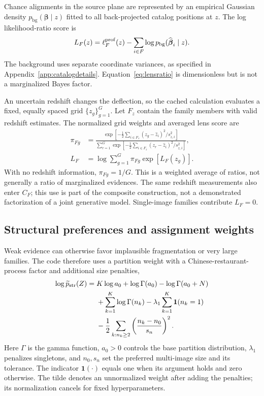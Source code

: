 \documentclass[twocolumn,twocolappendix,linenumbers]{aastex701}
\newcommand{\ind}{\mathbf{1}}
\newcommand{\bg}{\mathrm{bg}}
\begin{document}
Chance alignments in the source plane are represented by an empirical Gaussian density $p_{\bg}(\boldsymbol{\beta}\mid z)$ fitted to all back-projected catalog positions at $z$.
The log likelihood-ratio score is
\begin{equation}
 L_F(z)=\ell_F^{\rm prof}(z)
       -\sum_{i\in F}\log p_{\bg}(\widehat{\boldsymbol{\beta}}_i\mid z).
 \label{eq:lensratio}
\end{equation}
The background uses separate coordinate variances, as specified in Appendix~\ref{app:catalogdetails}.
Equation~\ref{eq:lensratio} is dimensionless but is not a marginalized Bayes factor.

An uncertain redshift changes the deflection, so the cached calculation evaluates a fixed, equally spaced grid $\{z_g\}_{g=1}^{G}$.
Let $F_z$ contain the family members with valid redshift estimates.
The normalized grid weights and averaged lens score are
\begin{equation}
 \begin{aligned}
 \pi_{Fg}&=
 \frac{\exp[-\tfrac12\sum_{i\in F_z}
           (z_g-\hat z_i)^2/s_{z,i}^2]}
      {\sum_{r=1}^{G}\exp[-\tfrac12\sum_{i\in F_z}
           (z_r-\hat z_i)^2/s_{z,i}^2]},\\
 L_F&=\log\sum_{g=1}^{G}\pi_{Fg}\exp[L_F(z_g)].
 \end{aligned}
 \label{eq:redshift}
\end{equation}
With no redshift information, $\pi_{Fg}=1/G$.
This is a weighted average of ratios, not generally a ratio of marginalized evidences.
The same redshift measurements also enter $C_F$; this use is part of the composite construction, not a demonstrated factorization of a joint generative model.
Single-image families contribute $L_F=0$.

\subsection{Structural preferences and assignment weights}
\label{sec:weights}
Weak evidence can otherwise favor implausible fragmentation or very large families.
The code therefore uses a partition weight with a Chinese-restaurant-process factor \citep{Pitman1995} and additional size penalties,
\begin{equation}
 \begin{aligned}
 \log\widetilde p_{\rm str}(Z)
 ={}&K\log a_0+\log\Gamma(a_0)-\log\Gamma(a_0+N)\\
 &+\sum_{k=1}^{K}\log\Gamma(n_k)
 -\lambda_1\sum_{k=1}^{K}\ind(n_k=1)\\
 &-\frac12\sum_{k:n_k\geq2}
       \left(\frac{n_k-n_0}{s_n}\right)^2.
 \end{aligned}
 \label{eq:prior}
\end{equation}
Here $\Gamma$ is the gamma function, $a_0>0$ controls the base partition distribution, $\lambda_1$ penalizes singletons, and $n_0,s_n$ set the preferred multi-image size and its tolerance.
The indicator $\ind(\cdot)$ equals one when its argument holds and zero otherwise.
The tilde denotes an unnormalized weight after adding the penalties; its normalization cancels for fixed hyperparameters.
\end{document}
